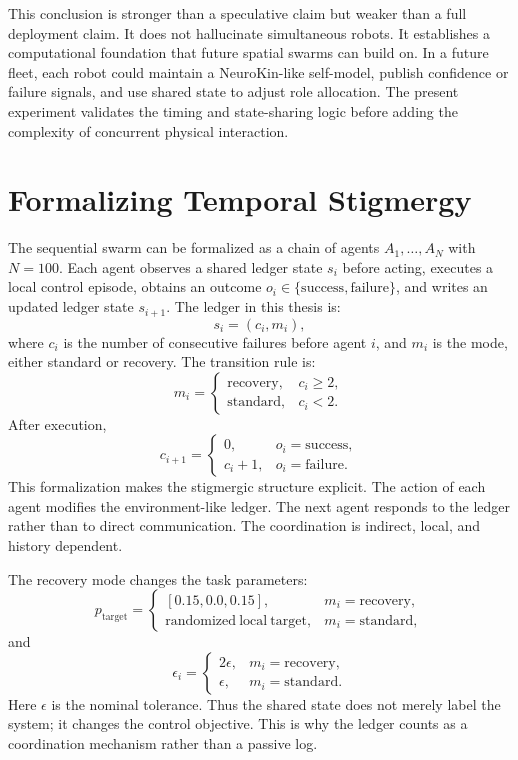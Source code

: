\documentclass[12pt,a4paper,oneside]{report}
\begin{document}
This conclusion is stronger than a speculative claim but weaker than a full deployment claim. It does not hallucinate simultaneous robots. It establishes a computational foundation that future spatial swarms can build on. In a future fleet, each robot could maintain a NeuroKin-like self-model, publish confidence or failure signals, and use shared state to adjust role allocation. The present experiment validates the timing and state-sharing logic before adding the complexity of concurrent physical interaction.

\section{Formalizing Temporal Stigmergy}

The sequential swarm can be formalized as a chain of agents $A_1,\ldots,A_N$ with $N=100$. Each agent observes a shared ledger state $s_i$ before acting, executes a local control episode, obtains an outcome $o_i \in \{\mathrm{success},\mathrm{failure}\}$, and writes an updated ledger state $s_{i+1}$. The ledger in this thesis is:
\[
  s_i = (c_i, m_i),
\]
where $c_i$ is the number of consecutive failures before agent $i$, and $m_i$ is the mode, either standard or recovery. The transition rule is:
\[
  m_i =
  \begin{cases}
  \mathrm{recovery}, & c_i \geq 2,\\
  \mathrm{standard}, & c_i < 2.
  \end{cases}
\]
After execution,
\[
  c_{i+1} =
  \begin{cases}
  0, & o_i = \mathrm{success},\\
  c_i + 1, & o_i = \mathrm{failure}.
  \end{cases}
\]
This formalization makes the stigmergic structure explicit. The action of each agent modifies the environment-like ledger. The next agent responds to the ledger rather than to direct communication. The coordination is indirect, local, and history dependent.

The recovery mode changes the task parameters:
\[
  p_{\mathrm{target}} =
  \begin{cases}
  [0.15,0.0,0.15], & m_i=\mathrm{recovery},\\
  \mathrm{randomized\ local\ target}, & m_i=\mathrm{standard},
  \end{cases}
\]
and
\[
  \epsilon_i =
  \begin{cases}
  2\epsilon, & m_i=\mathrm{recovery},\\
  \epsilon, & m_i=\mathrm{standard}.
  \end{cases}
\]
Here $\epsilon$ is the nominal tolerance. Thus the shared state does not merely label the system; it changes the control objective. This is why the ledger counts as a coordination mechanism rather than a passive log.
\end{document}
